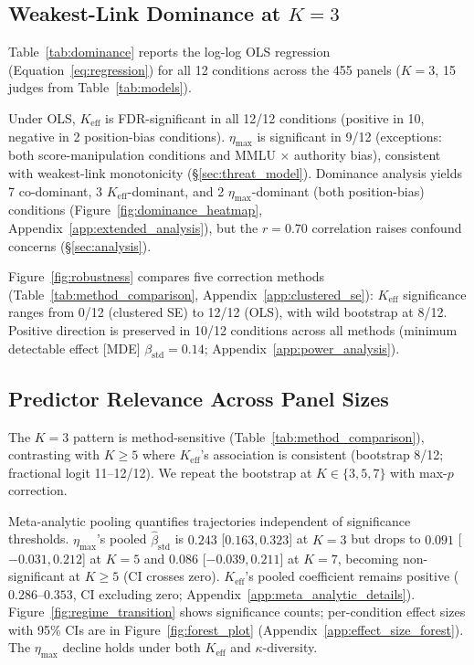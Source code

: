 \subsection{Weakest-Link Dominance at \texorpdfstring{$K{=}3$}{K=3}}
\label{sec:dominance}

Table~\ref{tab:dominance} reports the log-log OLS regression (Equation~\ref{eq:regression}) for all 12 conditions across the 455 panels ($K{=}3$, 15 judges from Table~\ref{tab:models}).

Under OLS, $K_{\mathrm{eff}}$ is FDR-significant in all 12/12 conditions (positive in 10, negative in 2 position-bias conditions). $\eta_{\max}$ is significant in 9/12 (exceptions: both score-manipulation conditions and MMLU $\times$ authority bias), consistent with weakest-link monotonicity (\S\ref{sec:threat_model}). Dominance analysis yields 7 co-dominant, 3 $K_{\mathrm{eff}}$-dominant, and 2 $\eta_{\max}$-dominant (both position-bias) conditions (Figure~\ref{fig:dominance_heatmap}, Appendix~\ref{app:extended_analysis}), but the $r{=}0.70$ correlation raises confound concerns (\S\ref{sec:analysis}).

Figure~\ref{fig:robustness} compares five correction methods (Table~\ref{tab:method_comparison}, Appendix~\ref{app:clustered_se}): $K_{\mathrm{eff}}$ significance ranges from 0/12 (clustered SE) to 12/12 (OLS), with wild bootstrap at 8/12. Positive direction is preserved in 10/12 conditions across all methods (minimum detectable effect [MDE] $\beta_{\mathrm{std}} {=} 0.14$; Appendix~\ref{app:power_analysis}).

\subsection{Predictor Relevance Across Panel Sizes}
\label{sec:cross_k}

The $K{=}3$ pattern is method-sensitive (Table~\ref{tab:method_comparison}), contrasting with $K{\geq}5$ where $K_{\mathrm{eff}}$'s association is consistent (bootstrap 8/12; fractional logit 11--12/12). We repeat the bootstrap at $K \in \{3, 5, 7\}$ with max-$p$ correction.

Meta-analytic pooling \citep{dersimonian1986meta} quantifies trajectories independent of significance thresholds. $\eta_{\max}$'s pooled $\hat{\beta}_{\mathrm{std}}$ is $0.243$ [$0.163, 0.323$] at $K{=}3$ but drops to $0.091$ [$-0.031, 0.212$] at $K{=}5$ and $0.086$ [$-0.039, 0.211$] at $K{=}7$, becoming non-significant at $K{\geq}5$ (CI crosses zero). $K_{\mathrm{eff}}$'s pooled coefficient remains positive ($0.286$--$0.353$, CI excluding zero; Appendix~\ref{app:meta_analytic_details}). Figure~\ref{fig:regime_transition} shows significance counts; per-condition effect sizes with 95\% CIs are in Figure~\ref{fig:forest_plot} (Appendix~\ref{app:effect_size_forest}). The $\eta_{\max}$ decline holds under both $K_{\mathrm{eff}}$ and $\kappa$-diversity.

